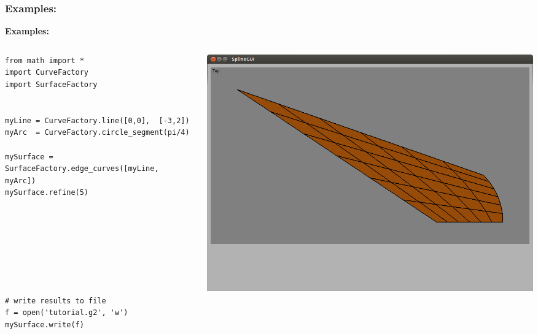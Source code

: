\documentclass{beamer}
\theoremstyle{plain}
\theoremstyle{definition}
\begin{document}

\begin{frame}[fragile]
\frametitle{Examples:}
\textbf{Examples:}
\begin{columns}
    \begin{column}{.50\linewidth}
        \begin{listing}[H]
            \tiny
            \begin{verbatim}
from math import *
import CurveFactory                                                            
import SurfaceFactory                                                            

                                                                               
myLine = CurveFactory.line([0,0],  [-3,2])                                   
myArc  = CurveFactory.circle_segment(pi/4)                                     

mySurface = SurfaceFactory.edge_curves([myLine, myArc])
mySurface.refine(5)







                                                                               
# write results to file                                                        
f = open('tutorial.g2', 'w')                                                   
mySurface.write(f)

            \end{verbatim}
        \end{listing}
    \end{column}
    \begin{column}{.45\linewidth}
        \includegraphics[width=\linewidth]{tutorial3}
    \end{column}
\end{columns}

\end{frame}
\end{document}
